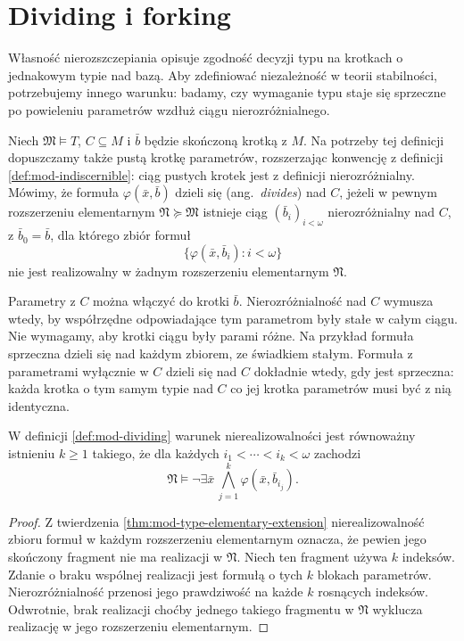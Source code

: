 \section{Dividing i forking}

Własność nierozszczepiania opisuje zgodność decyzji
typu na krotkach o jednakowym typie nad bazą.
Aby zdefiniować niezależność w teorii stabilności,
potrzebujemy innego warunku: badamy, czy wymaganie
typu staje się sprzeczne po powieleniu parametrów
wzdłuż ciągu nierozróżnialnego.

\begin{definicja}[Dividing]
\label{def:mod-dividing}
Niech $\mathfrak M\models T$, $C\subseteq M$
i $\bar b$ będzie skończoną krotką z $M$.
Na potrzeby tej definicji dopuszczamy także
pustą krotkę parametrów, rozszerzając konwencję
z definicji \ref{def:mod-indiscernible}:
ciąg pustych krotek jest z definicji
nierozróżnialny.
Mówimy, że formuła $\varphi(\bar x,\bar b)$
dzieli się (ang.~\emph{divides}) nad $C$,
jeżeli w pewnym rozszerzeniu elementarnym
$\mathfrak N\succeq\mathfrak M$ istnieje
ciąg $(\bar b_i)_{i<\omega}$ nierozróżnialny
nad $C$, z $\bar b_0=\bar b$, dla którego
zbiór formuł
\[
\{\varphi(\bar x,\bar b_i):i<\omega\}
\]
nie jest realizowalny w żadnym rozszerzeniu
elementarnym $\mathfrak N$.
\end{definicja}

Parametry z $C$ można włączyć do krotki
$\bar b$. Nierozróżnialność nad $C$ wymusza
wtedy, by współrzędne odpowiadające tym
parametrom były stałe w całym ciągu.
Nie wymagamy, aby krotki ciągu były parami
różne. Na przykład formuła sprzeczna dzieli się
nad każdym zbiorem, ze świadkiem stałym.
Formuła z parametrami wyłącznie w $C$ dzieli się
nad $C$ dokładnie wtedy, gdy jest sprzeczna:
każda krotka o tym samym typie nad $C$ co jej
krotka parametrów musi być z nią identyczna.

\begin{lemat}
\label{lem:mod-dividing-k-inconsistency}
W definicji \ref{def:mod-dividing} warunek
nierealizowalności jest równoważny istnieniu
$k\geq1$ takiego, że dla każdych
$i_1<\cdots<i_k<\omega$ zachodzi
\[
\mathfrak N\models
\neg\exists\bar x\,
\bigwedge_{j=1}^k\varphi(\bar x,\bar b_{i_j}).
\]
\end{lemat}
\begin{proof}
Z twierdzenia \ref{thm:mod-type-elementary-extension}
nierealizowalność zbioru formuł w każdym
rozszerzeniu elementarnym oznacza, że pewien
jego skończony fragment nie ma realizacji
w $\mathfrak N$. Niech ten fragment używa
$k$ indeksów. Zdanie o braku wspólnej
realizacji jest formułą o tych $k$ blokach
parametrów. Nierozróżnialność przenosi jego
prawdziwość na każde $k$ rosnących indeksów.
Odwrotnie, brak realizacji choćby jednego
takiego fragmentu w $\mathfrak N$ wyklucza
realizację w jego rozszerzeniu elementarnym.
\end{proof}

